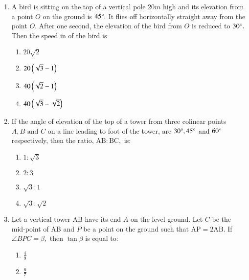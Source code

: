 \begin{enumerate}[label=\thesubsection.\arabic*,ref=\thesubsection.\theenumi]
\begin{multicols}{4}
\begin{enumerate}
        \item $\frac{7\sqrt{3}}{2}\brak{\sqrt{3}-1}m$ 
	\item $\frac{7\sqrt{3}}{2\brak{\sqrt{3}+1}}m$
\end{enumerate}
\end{multicols} 
\item A bird is sitting on the top of a vertical pole $20m$ high and its elevation from a point ${O}$ on the  ground is $45\degree.$ It flies off horizontally straight away from the point ${O}$. After one second, the elevation of the bird from ${O}$ is reduced to $30\degree.$ Then the speed in  of the bird is \hfill{}
\begin{multicols}{4}
\begin{enumerate}
        \item $20\sqrt{2}$                    
        \item $20\left(\sqrt{3}-1\right)$ 
        \item $40\left(\sqrt{2}-1\right)$ 
        \item $40\left(\sqrt{3}-\sqrt{2}\right)$
\end{enumerate}
\end{multicols} 
%
\item If the angle of elevation of the top of a tower from three colinear points ${A},{B}\text{ and }{C}$ on a line leading to foot of the tower, are $30\degree,45\degree$ and  $60\degree$ respectively, then the ratio, $\text{AB}:\text{BC},$ is: 
\hfill{}
\begin{multicols}{4}
\begin{enumerate}
        \item $1:\sqrt{3}$                    
        \item $2:3$ 
        \item $\sqrt{3}:1$ 
        \item $\sqrt{3}:\sqrt{2}$
\end{enumerate}
\end{multicols} 
%
\item Let a vertical tower AB have its end ${A}$ on the level ground. Let ${C}$ be the  mid-point of AB and ${P}$ be a point on the ground such that $\text{AP}=2\text{AB}.$ If $\angle{BPC}=\beta,$ then $\tan \beta$ is equal to: \hfill{}
\begin{multicols}{4}
\begin{enumerate}
        \item $\frac{4}{9}$                    
        \item $\frac{6}{7}$ 

\end{enumerate}
\end{multicols}
\end{enumerate}
